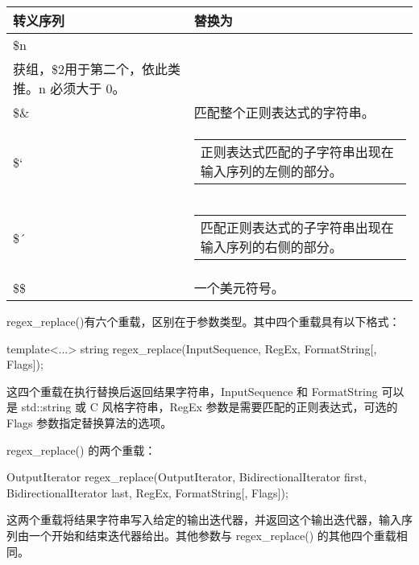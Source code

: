 \begin{longtable}{|l|l|}
\hline
\textbf{转义序列} &
\textbf{替换为} \\ \hline
\endfirsthead
%
\endhead
%
\$n &
\begin{tabular}[c]{@{}l@{}}匹配第n个捕获组的字符串；例如，\$1用于第一个捕\\获组，\$2用于第二个，依此类推。n 必须大于 0。
\end{tabular} \\ \hline
\$\& &
匹配整个正则表达式的字符串。 \\ \hline
\$` &
\begin{tabular}[c]{@{}l@{}}正则表达式匹配的子字符串出现在输入序列的左侧的部分。\end{tabular} \\ \hline
\$´ &
\begin{tabular}[c]{@{}l@{}}匹配正则表达式的子字符串出现在输入序列的右侧的部分。\end{tabular} \\ \hline
\$\$ &
一个美元符号。 \\ \hline
\end{longtable}

regex\_replace()有六个重载，区别在于参数类型。其中四个重载具有以下格式：

\begin{cpp}
template<...>
string regex_replace(InputSequence, RegEx, FormatString[, Flags]);
\end{cpp}

这四个重载在执行替换后返回结果字符串，InputSequence 和 FormatString 可以是 std::string 或 C 风格字符串，RegEx 参数是需要匹配的正则表达式，可选的 Flags 参数指定替换算法的选项。

regex\_replace() 的两个重载：

\begin{cpp}
OutputIterator regex_replace(OutputIterator,
                             BidirectionalIterator first,
                             BidirectionalIterator last,
                             RegEx, FormatString[, Flags]);
\end{cpp}

这两个重载将结果字符串写入给定的输出迭代器，并返回这个输出迭代器，输入序列由一个开始和结束迭代器给出。其他参数与 regex\_replace() 的其他四个重载相同。


